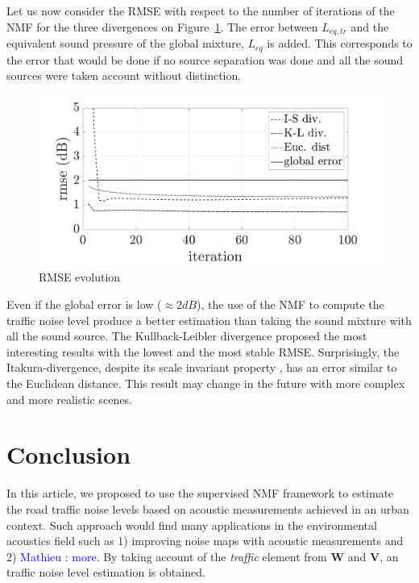 \documentclass{article}
\newcommand{\ml}[1]{\textcolor{blue}{ Mathieu : #1}}
\begin{document}
\begin{sloppy}
Let us now consider the RMSE with respect to the number of iterations of the NMF for the three divergences on Figure~\ref{fig:rmse}. The error between $L_{eq,tr}$ and the equivalent sound pressure of the global mixture, $L_{eq}$ is added. This corresponds to the error that would be done if no source separation was done and all the sound sources were taken account without distinction.\\

\begin{figure}[t]
\centering
\centerline{\includegraphics[scale=0.30]{images/comparaison_RMSE_nbCl3.pdf}}
\caption{RMSE evolution}
\label{fig:rmse}
\end{figure}

Even if the global error is low ($\approx 2 dB$), the use of the NMF to compute the traffic noise level produce a better estimation than taking the sound mixture with all the sound source. The Kullback-Leibler divergence proposed the most interesting results with the lowest and the most stable RMSE. 
Surprisingly, the Itakura-divergence, despite its scale invariant property \cite{fevotte2011}, has an error similar to the Euclidean distance. This result may change in the future with more complex and more realistic scenes.


\section{Conclusion}

In this article, we proposed to use the supervised NMF framework to estimate the road traffic noise levels based on acoustic measurements achieved in an urban context. Such approach would find many applications in the environmental acoustics field such as 1) improving noise maps with acoustic measurements and 2) \ml{more}. By taking account of the \textit{traffic} element from $\mathbf{W}$ and $\mathbf{V}$, an traffic noise level estimation is obtained.


\end{sloppy}
\end{document}
